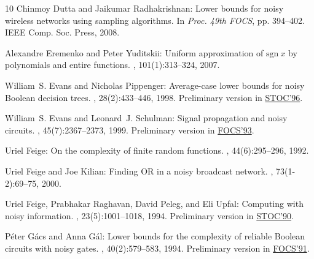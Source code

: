 \begin{thebibliography}{10}
{\sc Chinmoy Dutta and Jaikumar Radhakrishnan}: Lower bounds for noisy wireless
  networks using sampling algorithms.
\newblock In {\em Proc. 49th FOCS}, pp. 394--402. IEEE Comp. Soc. Press, 2008.

{\sc Alexandre Eremenko and Peter Yuditskii}: Uniform approximation of
  $\mathrm{sgn}~x$ by polynomials and entire functions.
, 101(1):313--324, 2007.
\newblock [\epfmtdoi{10.1007/s11854-007-0011-3}]

{\sc William~S. Evans and Nicholas Pippenger}: Average-case lower bounds for
  noisy {B}oolean decision trees.
, 28(2):433--446, 1998.
\newblock Preliminary version in
  \href{http://dx.doi.org/10.1145/237814.238013}{STOC'96}.
\newblock [\epfmtdoi{10.1137/S0097539796310102}]

{\sc William~S. Evans and Leonard~J. Schulman}: Signal propagation and noisy
  circuits.
, 45(7):2367--2373, 1999.
\newblock Preliminary version in
  \href{http://dx.doi.org/10.1109/SFCS.1993.366827}{FOCS'93}.
\newblock [\epfmtdoi{10.1109/18.796377}]

{\sc Uriel Feige}: On the complexity of finite random functions.
, 44(6):295--296, 1992.
\newblock [\epfmtdoi{10.1016/0020-0190(92)90102-2}]

{\sc Uriel Feige and Joe Kilian}: Finding {OR} in a noisy broadcast network.
, 73(1-2):69--75, 2000.
\newblock [\epfmtdoi{10.1016/S0020-0190(00)00002-8}]

{\sc Uriel Feige, Prabhakar Raghavan, David Peleg, and Eli Upfal}: Computing
  with noisy information.
, 23(5):1001--1018, 1994.
\newblock Preliminary version in
  \href{http://dx.doi.org/10.1145/100216.100230}{STOC'90}.
\newblock [\epfmtdoi{10.1137/S0097539791195877}]

{\sc P{\'e}ter G{\'a}cs and Anna G{\'a}l}: Lower bounds for the complexity of
  reliable {B}oolean circuits with noisy gates.
, 40(2):579--583, 1994.
\newblock Preliminary version in
  \href{http://dx.doi.org/10.1109/SFCS.1991.185424}{FOCS'91}.
\newblock [\epfmtdoi{10.1109/18.312190}]


\end{thebibliography}
